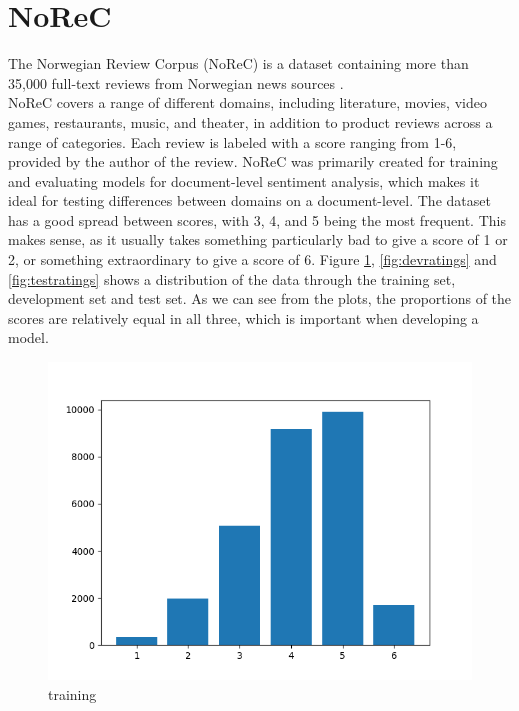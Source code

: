 \documentclass{report}
\begin{document}

\section{NoReC}
The Norwegian Review Corpus (NoReC) is a dataset containing more than 35,000 full-text reviews from Norwegian news sources \cite{11509/124}.\\
NoReC covers a range of different domains, including literature, movies, video games, restaurants, music, and theater, in addition to product reviews across a range of categories. Each review is labeled with a score ranging from 1-6, provided by the author of the review. NoReC was primarily created for training and evaluating models for document-level sentiment analysis, which makes it ideal for testing differences between domains on a document-level. The dataset has a good spread between scores, with 3, 4, and 5 being the most frequent. This makes sense, as it usually takes something particularly bad to give a score of 1 or 2, or something extraordinary to give a score of 6. Figure \ref{fig:trainratings}, \ref{fig:devratings} and \ref{fig:testratings} shows a distribution of the data through the training set, development set and test set. As we can see from the plots, the proportions of the scores are relatively equal in all three, which is important when developing a model. 
\begin{figure}[h!]
	\centering
	\includegraphics[scale=0.5]{img/train_ratings}
	\caption{training}
	\label{fig:trainratings}
\end{figure}%
\end{document}
